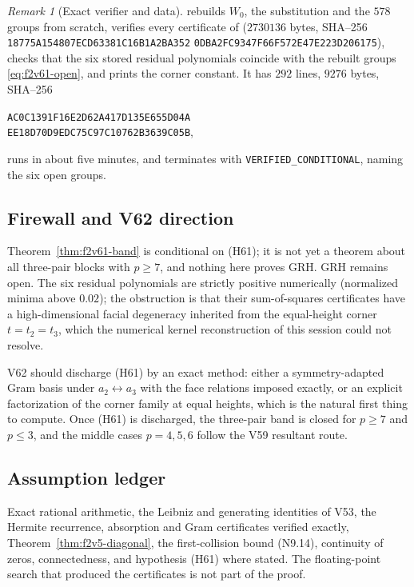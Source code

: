 \documentclass[11pt]{article}
\theoremstyle{definition}
\theoremstyle{remark}
\newtheorem{remark}[theorem]{Remark}
\begin{document}
\begin{remark}[Exact verifier and data]
\label{rem:f2v61-verifier}
 rebuilds
\(W_0\), the substitution and the \(578\) groups from scratch, verifies
every certificate of
(\(2730136\) bytes, SHA--256
\texttt{18775A154807ECD63381C16B1A2BA352}\allowbreak
\texttt{0DBA2FC9347F66F572E47E223D206175}), checks that the six stored
residual polynomials coincide with the rebuilt groups
\eqref{eq:f2v61-open}, and prints the corner constant.  It has \(292\)
lines, \(9276\) bytes, SHA--256
\begin{center}
\texttt{AC0C1391F16E2D62A417D135E655D04A}\\
\texttt{EE18D70D9EDC75C97C10762B3639C05B},
\end{center}
runs in about five minutes, and terminates with
\texttt{VERIFIED\_CONDITIONAL}, naming the six open groups.
\end{remark}

\subsection*{Firewall and V62 direction}
\label{fire:f2v61}
Theorem~\ref{thm:f2v61-band} is conditional on (H61); it is not yet a
theorem about all three-pair blocks with \(p\ge7\), and nothing here
proves GRH.  GRH remains open.  The six residual polynomials are
strictly positive numerically (normalized minima above \(0.02\)); the
obstruction is that their sum-of-squares certificates have a
high-dimensional facial degeneracy inherited from the equal-height
corner \(t=t_2=t_3\), which the numerical kernel reconstruction of this
session could not resolve.

V62 should discharge (H61) by an exact method: either a
symmetry-adapted Gram basis under \(a_2\leftrightarrow a_3\) with the
face relations imposed exactly, or an explicit factorization of the
corner family at equal heights, which is the natural first thing to
compute.  Once (H61) is discharged, the three-pair band is closed for
\(p\ge7\) and \(p\le3\), and the middle cases \(p=4,5,6\) follow the
V59 resultant route.

\subsection*{Assumption ledger}
\label{ass:f2v61}
Exact rational arithmetic, the Leibniz and generating identities of
V53, the Hermite recurrence, absorption and Gram certificates verified
exactly, Theorem~\ref{thm:f2v5-diagonal}, the first-collision bound
\textup{(N9.14)}, continuity of zeros, connectedness, and hypothesis
(H61) where stated.  The floating-point search that produced the
certificates is not part of the proof.
\endgroup
\end{document}
